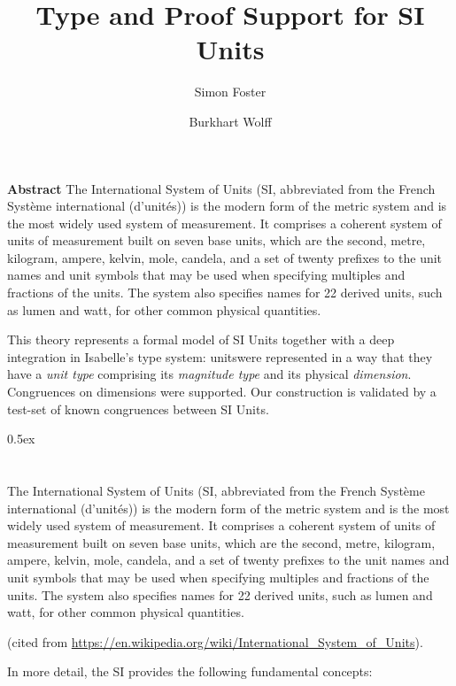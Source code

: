 \documentclass[11pt,a4paper]{book}
\begin{document}
\title{Type and Proof Support for SI Units}
\author{ Simon Foster \and Burkhart Wolff}
\maketitle

\textbf{ Abstract } 
The International System of Units 
(SI, abbreviated from the French Syst\`eme international (d’unit\'es)) is the modern form of 
the metric system and is the most widely used system of measurement. It comprises a coherent 
system of units of measurement built on seven base units, which are the second, metre, kilogram, 
ampere, kelvin, mole, candela, and a set of twenty prefixes to the unit names and unit symbols 
that may be used when specifying multiples and fractions of the units. The system also specifies 
names for 22 derived units, such as lumen and watt, for other common physical quantities. 

This theory represents a formal model of SI Units together with a deep integration in Isabelle's
type system: unitswere represented in a way that they have a \emph{unit type} comprising its 
\emph{magnitude type} and its physical \emph{dimension}. Congruences on dimensions were supported. 
Our construction is validated by a test-set of known congruences between SI Units.

\tableofcontents

\parindent 0pt\parskip 0.5ex


\chapter{}

The International System of Units (SI, abbreviated from the French
Système international (d'unités)) is the modern form of the metric
system and is the most widely used system of measurement. It comprises
a coherent system of units of measurement built on seven base units,
which are the second, metre, kilogram, ampere, kelvin, mole, candela,
and a set of twenty prefixes to the unit names and unit symbols that
may be used when specifying multiples and fractions of the units.
The system also specifies names for 22 derived units, such as lumen and
watt, for other common physical quantities.

(cited from \url{https://en.wikipedia.org/wiki/International_System_of_Units}).

In more detail, the SI provides the following fundamental concepts:
\end{document}
